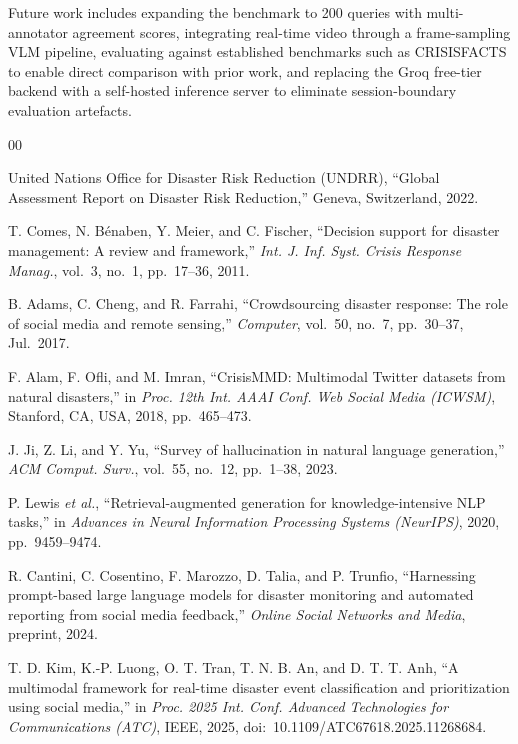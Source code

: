 \documentclass[conference]{IEEEtran}
\begin{document}
Future work includes expanding the benchmark to 200 queries with multi-annotator
agreement scores, integrating real-time video through a frame-sampling VLM
pipeline, evaluating against established benchmarks such as CRISISFACTS to
enable direct comparison with prior work, and replacing the Groq free-tier
backend with a self-hosted inference server to eliminate session-boundary
evaluation artefacts.

\begin{thebibliography}{00}

 United Nations Office for Disaster Risk Reduction (UNDRR),
``Global Assessment Report on Disaster Risk Reduction,''
Geneva, Switzerland, 2022.

 T. Comes, N. B\'{e}naben, Y. Meier, and C. Fischer,
``Decision support for disaster management: A review and framework,''
\textit{Int. J. Inf. Syst. Crisis Response Manag.}, vol.~3, no.~1,
pp.~17--36, 2011.

 B. Adams, C. Cheng, and R. Farrahi,
``Crowdsourcing disaster response: The role of social media and remote
sensing,'' \textit{Computer}, vol.~50, no.~7, pp.~30--37, Jul.~2017.

 F. Alam, F. Ofli, and M. Imran,
``CrisisMMD: Multimodal Twitter datasets from natural disasters,''
in \textit{Proc. 12th Int. AAAI Conf. Web Social Media (ICWSM)},
Stanford, CA, USA, 2018, pp.~465--473.

 J. Ji, Z. Li, and Y. Yu,
``Survey of hallucination in natural language generation,''
\textit{ACM Comput. Surv.}, vol.~55, no.~12, pp.~1--38, 2023.

 P. Lewis \textit{et al.},
``Retrieval-augmented generation for knowledge-intensive NLP tasks,''
in \textit{Advances in Neural Information Processing Systems (NeurIPS)},
2020, pp.~9459--9474.

 R. Cantini, C. Cosentino, F. Marozzo, D. Talia, and P. Trunfio,
``Harnessing prompt-based large language models for disaster monitoring and
automated reporting from social media feedback,''
\textit{Online Social Networks and Media}, preprint, 2024.

 T. D. Kim, K.-P. Luong, O. T. Tran, T. N. B. An, and
D. T. T. Anh, ``A multimodal framework for real-time disaster event
classification and prioritization using social media,''
in \textit{Proc. 2025 Int. Conf. Advanced Technologies for Communications
(ATC)}, IEEE, 2025, doi:~10.1109/ATC67618.2025.11268684.


\end{thebibliography}
\end{document}
